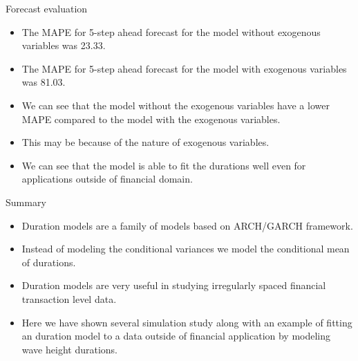 \documentclass[
  ignorenonframetext,
]{beamer}
\begin{document}
\begin{frame}{Forecast evaluation}
\protect\hypertarget{forecast-evaluation}{}
\begin{itemize}
\item
  The MAPE for 5-step ahead forecast for the model without exogenous
  variables was 23.33.
\item
  The MAPE for 5-step ahead forecast for the model with exogenous
  variables was 81.03.
\item
  We can see that the model without the exogenous variables have a lower
  MAPE compared to the model with the exogenous variables.
\item
  This may be because of the nature of exogenous variables.
\item
  We can see that the model is able to fit the durations well even for
  applications outside of financial domain.
\end{itemize}
\end{frame}

\begin{frame}{Summary}
\protect\hypertarget{summary}{}
\begin{itemize}
\item
  Duration models are a family of models based on ARCH/GARCH framework.
\item
  Instead of modeling the conditional variances we model the conditional
  mean of durations.
\item
  Duration models are very useful in studying irregularly spaced
  financial transaction level data.
\item
  Here we have shown several simulation study along with an example of
  fitting an duration model to a data outside of financial application
  by modeling wave height durations.
\end{itemize}
\end{frame}
\end{document}
